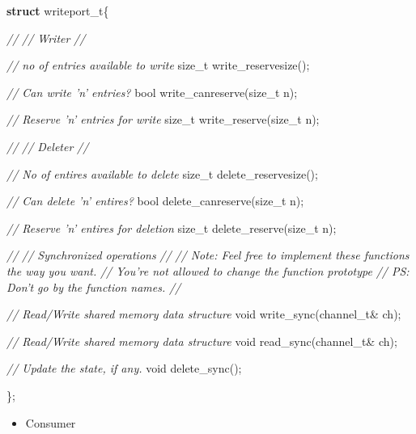 \documentclass[]{book}
\newenvironment{Shaded}{}{}
\newcommand{\KeywordTok}[1]{\textbf{{#1}}}
\newcommand{\DataTypeTok}[1]{\textcolor[rgb]{0.50,0.00,0.00}{{#1}}}
\newcommand{\CommentTok}[1]{\textcolor[rgb]{0.50,0.50,0.50}{\textit{{#1}}}}
\newcommand{\NormalTok}[1]{{#1}}
\begin{document}
\begin{Shaded}
\begin{Highlighting}[]

\KeywordTok{struct} \NormalTok{writeport_t\{}


  \CommentTok{//}
  \CommentTok{// Writer}
  \CommentTok{//}


  \CommentTok{// no of entries available to write}
  \NormalTok{size_t write_reservesize();}

  \CommentTok{// Can write 'n' entries?}
  \NormalTok{bool write_canreserve(size_t n);}

  \CommentTok{// Reserve 'n' entries for write}
  \NormalTok{size_t write_reserve(size_t n);}


  \CommentTok{//}
  \CommentTok{// Deleter}
  \CommentTok{//}


  \CommentTok{// No of entires available to delete}
  \NormalTok{size_t delete_reservesize();}


  \CommentTok{// Can delete 'n' entires?}
  \NormalTok{bool delete_canreserve(size_t n);}


  \CommentTok{// Reserve 'n' entires for deletion}
  \NormalTok{size_t delete_reserve(size_t n);}



  \CommentTok{//}
  \CommentTok{// Synchronized operations}
  \CommentTok{//}
  \CommentTok{// Note: Feel free to implement these functions the way you want.}
  \CommentTok{//       You're not allowed to change the function prototype}
  \CommentTok{// PS:   Don't go by the function names.}
  \CommentTok{//}

  \CommentTok{// Read/Write shared memory data structure}
  \DataTypeTok{void} \NormalTok{write_sync(channel_t& ch);}

  \CommentTok{// Read/Write shared memory data structure}
  \DataTypeTok{void} \NormalTok{read_sync(channel_t& ch);}

  \CommentTok{// Update the state, if any.}
  \DataTypeTok{void} \NormalTok{delete_sync();}


\NormalTok{\};}
\end{Highlighting}
\end{Shaded}

\begin{itemize}
\itemsep1pt\parskip0pt
\item
  Consumer
\end{itemize}
\end{document}
